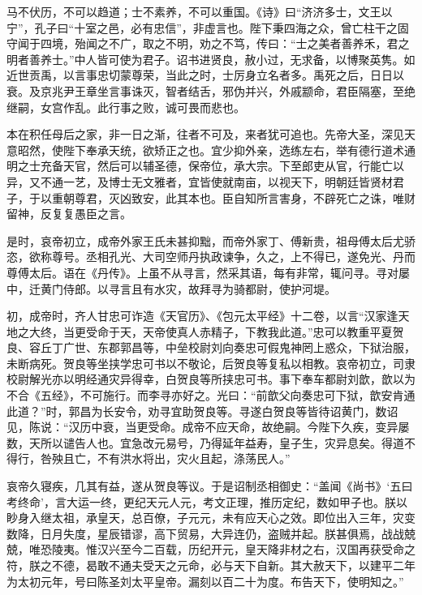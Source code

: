 \documentclass[12pt,UTF8]{ctexbook}
\begin{document}
马不伏历，不可以趋道；士不素养，不可以重国。《诗》曰“济济多士，文王以宁”，孔子曰“十室之邑，必有忠信”，非虚言也。陛下秉四海之众，曾亡柱干之固守闻于四境，殆闻之不广，取之不明，劝之不笃，传曰：“士之美者善养禾，君之明者善养士。”中人皆可使为君子。诏书进贤良，赦小过，无求备，以博聚英隽。如近世贡禹，以言事忠切蒙尊荣，当此之时，士厉身立名者多。禹死之后，日日以衰。及京兆尹王章坐言事诛灭，智者结舌，邪伪并兴，外戚颛命，君臣隔塞，至绝继嗣，女宫作乱。此行事之败，诚可畏而悲也。



本在积任母后之家，非一日之渐，往者不可及，来者犹可追也。先帝大圣，深见天意昭然，使陛下奉承天统，欲矫正之也。宜少抑外亲，选练左右，举有德行道术通明之士充备天官，然后可以辅圣德，保帝位，承大宗。下至郎吏从官，行能亡以异，又不通一艺，及博士无文雅者，宜皆使就南亩，以视天下，明朝廷皆贤材君子，于以重朝尊君，灭凶致安，此其本也。臣自知所言害身，不辟死亡之诛，唯财留神，反复复愚臣之言。



是时，哀帝初立，成帝外家王氏未甚抑黜，而帝外家丁、傅新贵，祖母傅太后尤骄恣，欲称尊号。丞相孔光、大司空师丹执政谏争，久之，上不得已，遂免光、丹而尊傅太后。语在《丹传》。上虽不从寻言，然采其语，每有非常，辄问寻。寻对屡中，迁黄门侍郎。以寻言且有水灾，故拜寻为骑都尉，使护河堤。



初，成帝时，齐人甘忠可诈造《天官历》、《包元太平经》十二卷，以言“汉家逢天地之大终，当更受命于天，天帝使真人赤精子，下教我此道。”忠可以教重平夏贺良、容丘丁广世、东郡郭昌等，中垒校尉刘向奏忠可假鬼神罔上惑众，下狱治服，未断病死。贺良等坐挟学忠可书以不敬论，后贺良等复私以相教。哀帝初立，司隶校尉解光亦以明经通灾异得幸，白贺良等所挟忠可书。事下奉车都尉刘歆，歆以为不合《五经》，不可施行。而李寻亦好之。光曰：“前歆父向奏忠可下狱，歆安肯通此道？”时，郭昌为长安令，劝寻宜助贺良等。寻遂白贺良等皆待诏黄门，数诏见，陈说：“汉历中衰，当更受命。成帝不应天命，故绝嗣。今陛下久疾，变异屡数，天所以谴告人也。宜急改元易号，乃得延年益寿，皇子生，灾异息矣。得道不得行，咎殃且亡，不有洪水将出，灾火且起，涤荡民人。”



哀帝久寝疾，几其有益，遂从贺良等议。于是诏制丞相御史：“盖闻《尚书》‘五曰考终命’，言大运一终，更纪天元人元，考文正理，推历定纪，数如甲子也。朕以眇身入继太祖，承皇天，总百僚，子元元，未有应天心之效。即位出入三年，灾变数降，日月失度，星辰错谬，高下贸易，大异连仍，盗贼并起。朕甚俱焉，战战兢兢，唯恐陵夷。惟汉兴至今二百载，历纪开元，皇天降非材之右，汉国再获受命之符，朕之不德，曷敢不通夫受天之元命，必与天下自新。其大赦天下，以建平二年为太初元年，号曰陈圣刘太平皇帝。漏刻以百二十为度。布告天下，使明知之。”
\end{document}
